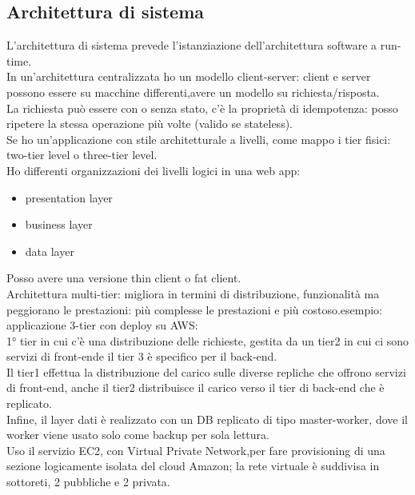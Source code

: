 \documentclass[16px]{article}
\begin{document}
\subsection{Architettura di sistema}
L'architettura di sistema prevede l'istanziazione dell'architettura software a run-time.\\In un'architettura centralizzata ho un modello client-server: client e server possono essere su macchine differenti,avere un modello su richiesta/risposta.\\ La richiesta può essere con o senza stato, c'è la proprietà di idempotenza: posso ripetere la stessa operazione più volte (valido se stateless).\\ Se ho un'applicazione con stile architetturale a livelli, come mappo i tier fisici: two-tier level o three-tier level.\\  Ho differenti organizzazioni dei livelli logici in una web app:
\begin{itemize}
\item presentation layer
\item business layer
\item data layer
\end{itemize}
Posso avere una versione thin client o fat client.\\ Architettura multi-tier: migliora in termini di distribuzione, funzionalità ma peggiorano le prestazioni: più complesse le prestazioni e più costoso.esempio: applicazione 3-tier con deploy su AWS:\\
1° tier in cui c'è una distribuzione delle richieste, gestita da un tier2 in cui ci sono servizi di front-ende il tier 3 è specifico per il back-end.\\ Il tier1 effettua la distribuzione del carico sulle diverse repliche che offrono servizi di front-end, anche il tier2 distribuisce il carico verso il tier di back-end che è replicato.\\ Infine, il layer dati è realizzato con un DB replicato di tipo master-worker, dove il worker viene usato solo come backup per sola lettura.\\ Uso il servizio EC2, con Virtual Private Network,per fare provisioning di una sezione logicamente isolata del cloud Amazon; la rete virtuale è suddivisa in sottoreti, 2 pubbliche e 2 privata.
\end{document}
